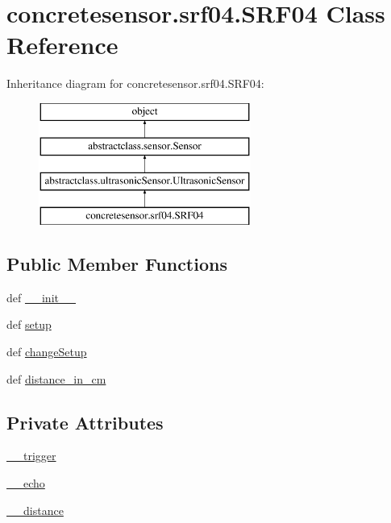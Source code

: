 \hypertarget{classconcretesensor_1_1srf04_1_1SRF04}{}\section{concretesensor.\+srf04.\+S\+R\+F04 Class Reference}
\label{classconcretesensor_1_1srf04_1_1SRF04}
Inheritance diagram for concretesensor.\+srf04.\+S\+R\+F04\+:\begin{figure}[H]
\begin{center}
\leavevmode
\includegraphics[height=4.000000cm]{classconcretesensor_1_1srf04_1_1SRF04}
\end{center}
\end{figure}
\subsection*{Public Member Functions}
\begin{DoxyCompactItemize}
\item 
def \hyperlink{classconcretesensor_1_1srf04_1_1SRF04_a99e8e1523c233dce23551faf17b6f840}{\+\_\+\+\_\+init\+\_\+\+\_\+}
\item 
def \hyperlink{classconcretesensor_1_1srf04_1_1SRF04_a9f45f02cf190ed17a29c7f1c72fe5bff}{setup}
\item 
def \hyperlink{classconcretesensor_1_1srf04_1_1SRF04_ae3bd1a14bf420b7ce34ebe211eb5718d}{change\+Setup}
\item 
def \hyperlink{classconcretesensor_1_1srf04_1_1SRF04_afbc826b8c66db3626dc04c5483d15729}{distance\+\_\+in\+\_\+cm}
\end{DoxyCompactItemize}
\subsection*{Private Attributes}
\begin{DoxyCompactItemize}
\item 
\hyperlink{classconcretesensor_1_1srf04_1_1SRF04_a33b763eddf880935842bec7700cc4e9d}{\+\_\+\+\_\+trigger}
\item 
\hyperlink{classconcretesensor_1_1srf04_1_1SRF04_a5b76d7e0ecac244d96515dbe5f6fd099}{\+\_\+\+\_\+echo}
\item 
\hyperlink{classconcretesensor_1_1srf04_1_1SRF04_a20024100a31377933b15b5af99123b11}{\+\_\+\+\_\+distance}
\end{DoxyCompactItemize}


